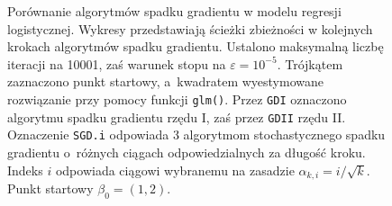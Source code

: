 \begin{figure}[hbt!]
  \caption[Porównanie algorytmów spadku gradientu dla punktu startowego $\beta_0 = (1,2)$.]{\label{fig:sc2asd}Porównanie algorytmów spadku gradientu w modelu regresji logistycznej. Wykresy przedstawiają ścieżki zbieżności w kolejnych krokach algorytmów spadku gradientu. Ustalono maksymalną liczbę iteracji na 10001, zaś warunek stopu na $\varepsilon=10^{-5}$. Trójkątem zaznaczono punkt startowy, a~kwadratem wyestymowane rozwiązanie przy pomocy funkcji \texttt{glm()}. Przez \texttt{GDI} oznaczono algorytmu spadku gradientu rzędu I, zaś przez \texttt{GDII} rzędu II. Oznaczenie \texttt{SGD.i} odpowiada 3 algorytmom stochastycznego spadku gradientu o~różnych ciągach odpowiedzialnych za długość kroku. Indeks $i$ odpowiada ciągowi wybranemu na zasadzie $\alpha_{k,i} = i/\sqrt{k}$. Punkt startowy $\beta_0 = (1,2)$.}
\end{figure}


